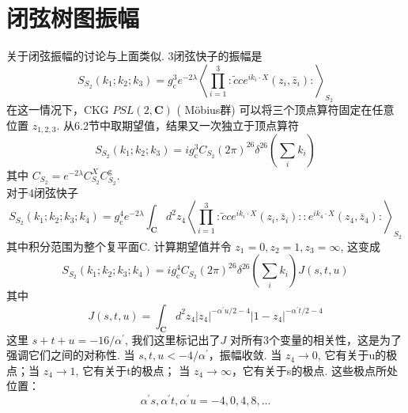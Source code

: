 \section{闭弦树图振幅}%

关于闭弦振幅的讨论与上面类似. 3闭弦快子的振幅是
\begin{equation}
	S_{S_{2}}\left(k_{1} ; k_{2} ; k_{3}\right)=g_{\mathrm{c}}^{3} e^{-2 \lambda}\left\langle\prod_{i=1}^{3}: \tilde{c} c e^{i k_{i} \cdot X}\left(z_{i}, \bar{z}_{i}\right):\right\rangle_{S_{2}}
\end{equation}
在这一情况下，CKG $P S L(2, \mathbf{C})$ ( Möbius群) 可以将三个顶点算符固定在任意位置 $z_{1,2,3}$. 从6.2节中取期望值，结果又一次独立于顶点算符
\begin{equation}
	S_{S_{2}}\left(k_{1} ; k_{2} ; k_{3}\right)=i g_{\mathrm{c}}^{3} C_{S_{2}}(2 \pi)^{26} \delta^{26}\left(\sum_{i} k_{i}\right)
\end{equation}
其中 $C_{S_{2}}=e^{-2 \lambda} C_{S_{2}}^{X} C_{S_{2}}^{\mathrm{g}}$.\\
对于4闭弦快子
\begin{equation}
	S_{S_{2}}\left(k_{1} ; k_{2} ; k_{3} ; k_{4}\right)=g_{\mathrm{c}}^{4} e^{-2 \lambda} \int_{\mathbf{C}} d^{2} z_{4}\left\langle\prod_{i=1}^{3}: \tilde{c} c e^{i k_{i} \cdot X}\left(z_{i}, \bar{z}_{i}\right):: e^{i k_{4} \cdot X}\left(z_{4}, \bar{z}_{4}\right):\right\rangle_{S_{2}}
\end{equation}
其中积分范围为整个复平面C. 计算期望值并令 $z_{1}=0, z_{2}=1, z_{3}=\infty$, 这变成
\begin{equation}
	S_{S_{2}}\left(k_{1} ; k_{2} ; k_{3} ; k_{4}\right)=i g_{\mathrm{c}}^{4} C_{S_{2}}(2 \pi)^{26} \delta^{26}\left(\sum_{i} k_{i}\right) J(s, t, u)
\end{equation}
其中
\begin{equation}
	J(s, t, u)=\int_{\mathbf{C}} d^{2} z_{4}\left|z_{4}\right|^{-\alpha^{\prime} u / 2-4}\left|1-z_{4}\right|^{-\alpha^{\prime} t / 2-4}
\end{equation}
这里 $s+t+u=-16 / \alpha^{\prime}$, 我们这里标记出了$J$ 对所有3个变量的相关性，这是为了强调它们之间的对称性. 当 $s, t, u<-4 / \alpha^{\prime}$，振幅收敛. 当 $z_{4} \rightarrow 0$, 它有关于u的极点；当 $z_{4} \rightarrow 1$, 它有关于t的极点； 当 $z_{4} \rightarrow \infty$，它有关于s的极点. 这些极点所处位置：
\begin{equation}
	\alpha^{\prime} s, \alpha^{\prime} t, \alpha^{\prime} u=-4,0,4,8, \ldots
\end{equation}

